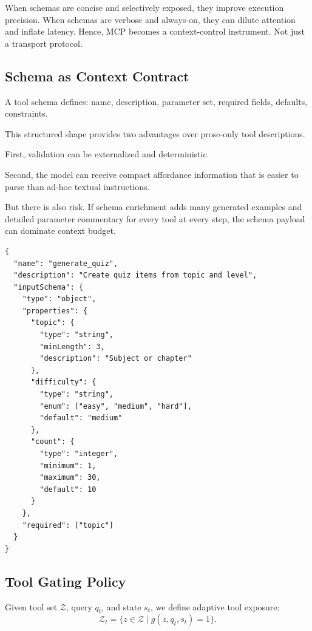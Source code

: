 \documentclass[conference]{IEEEtran}
\begin{document}
When schemas are concise and selectively exposed, they improve execution precision.
When schemas are verbose and always-on, they can dilute attention and inflate latency.
Hence,
MCP becomes a context-control instrument.
Not just a transport protocol.

\subsection{Schema as Context Contract}

A tool schema defines:
name,
description,
parameter set,
required fields,
defaults,
constraints.

This structured shape provides two advantages over prose-only tool descriptions.

First,
validation can be externalized and deterministic.

Second,
the model can receive compact affordance information that is easier to parse than ad-hoc textual instructions.

But there is also risk.
If schema enrichment adds many generated examples and detailed parameter commentary for every tool at every step, the schema payload can dominate context budget.

\begin{lstlisting}[style=jsonStyle, caption={Example MCP tool contract structure with validation-relevant fields.}, label={lst:mcp_contract}]
{
  "name": "generate_quiz",
  "description": "Create quiz items from topic and level",
  "inputSchema": {
    "type": "object",
    "properties": {
      "topic": {
        "type": "string",
        "minLength": 3,
        "description": "Subject or chapter"
      },
      "difficulty": {
        "type": "string",
        "enum": ["easy", "medium", "hard"],
        "default": "medium"
      },
      "count": {
        "type": "integer",
        "minimum": 1,
        "maximum": 30,
        "default": 10
      }
    },
    "required": ["topic"]
  }
}
\end{lstlisting}

\subsection{Tool Gating Policy}

Given tool set $\mathcal{Z}$,
query $q_t$,
and state $s_t$,
we define adaptive tool exposure:
\begin{equation}
\mathcal{Z}_t = \{z \in \mathcal{Z} \mid g(z,q_t,s_t)=1\}.
\label{eq:tool_gating}
\end{equation}
\end{document}

